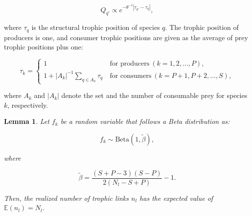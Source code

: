 \documentclass[11pt, class=article, crop=false]{standalone}
\newtheorem{lemma}{Lemma}[subsection]
\theoremstyle{definition}
\begin{document}
\begin{equation}
    Q_{q'} \propto e^{-\theta^{-1} |\tau_{q'} - \tau_q|},
\end{equation}

where $\tau_q$ is the structural trophic position of species $q$.
The trophic position of producers is one, and
consumer trophic positions are given as the average of prey trophic positions plus one:

\begin{equation}
    \tau_k = 
    \begin{cases}
    1 & ~\text{for producers}~ (k=1, 2, \ldots, P),\\
    1 + |A_{k}|^{-1} \sum_{q \in A_{k}} \tau_q & ~\text{for consumers}~ (k = P+1, P+2, \ldots, S),
    \end{cases}
\end{equation}

where $A_{k}$ and $|A_{k}|$ denote the set and the number of consumable prey for species $k$, respectively.

\begin{lemma}
\label{lemma-beta-tilde}
    Let $f_k$ be a random variable that follows a Beta distribution as:

    \begin{equation}
        f_k \sim \mbox{Beta}(1, \tilde{\beta}),
    \end{equation}

    where

    \begin{equation}
        \tilde{\beta} = \frac{(S + P - 3)(S - P)}{2(N_l - S + P)} - 1.
        \label{eq:beta-tilde}
    \end{equation}

    Then, the realized number of trophic links $n_l$ has the expected value of $\mathbb{E}(n_l) = N_l$.
\end{lemma}
\end{document}
